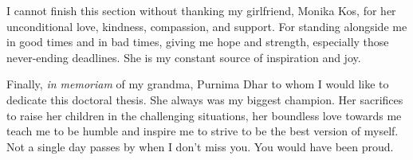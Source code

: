 I cannot finish this section without thanking my girlfriend, Monika Kos, for her unconditional love, kindness, compassion, and support. For standing alongside me in good times and in bad times, giving me hope and strength, especially those never-ending deadlines. She is my constant source of inspiration and joy.

\vspace{1cm}
Finally, \emph{in memoriam} of my grandma, Purnima Dhar to whom I would like to dedicate this doctoral thesis. She always was my biggest champion. Her sacrifices to raise her children in the challenging  situations, her boundless love towards me teach me to be humble and inspire me to strive to be the best version of myself. Not a single day passes by when I don't miss you. You would have been proud.


\endgroup
